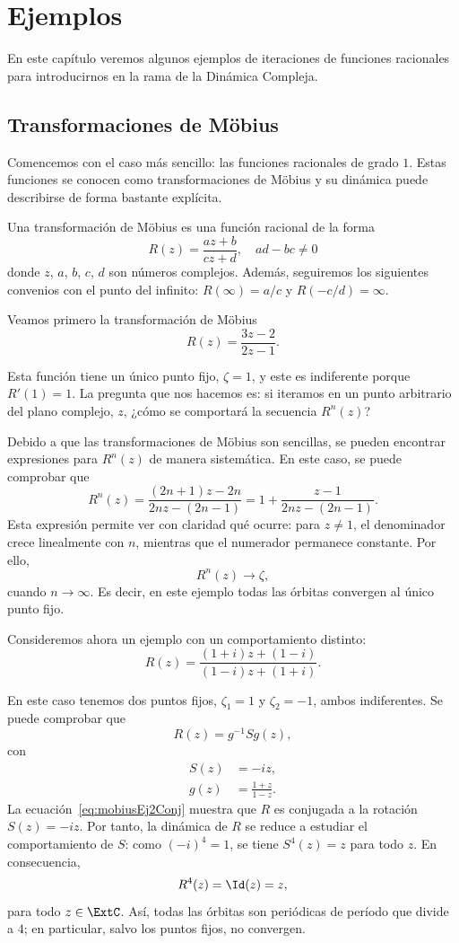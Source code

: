 \chapter{Ejemplos}
En este capítulo veremos algunos ejemplos de iteraciones de funciones racionales
para introducirnos en la rama de la Dinámica Compleja.

\section{Transformaciones de Möbius}
Comencemos con el caso más sencillo: las funciones racionales de grado $1$.
Estas funciones se conocen como transformaciones de Möbius y su dinámica puede
describirse de forma bastante explícita.

\begin{definicion}
    Una transformación de Möbius es una función racional de la forma
    \[
        R(z) = \frac{az+b}{cz+d}, \quad ad-bc \ne 0
    \] 
    donde $z$, $a$, $b$, $c$, $d$ son números complejos. Además, seguiremos los
    siguientes convenios con el punto del infinito: $R(\infty)=a/c$ y
    $R(-c/d)= \infty$.
\end{definicion}

Veamos primero la transformación de Möbius
\[
    R(z) = \frac{3z-2}{2z-1}.
\]

Esta función tiene un único punto fijo, $\zeta = 1$, y este es indiferente
porque $R'(1) = 1$. La pregunta que nos hacemos es: si iteramos en un punto
arbitrario del plano complejo, $z$, ¿cómo se comportará la secuencia $R^n(z)$?

Debido a que las transformaciones de Möbius son sencillas, se pueden encontrar
expresiones para $R^n(z)$ de manera sistemática. En este caso, se puede
comprobar que
\[
    R^n(z) = \frac{(2n+1)z-2n}{2nz-(2n-1)} =  1 + \frac{z-1}{2nz-(2n-1)}.
\]
Esta expresión permite ver con claridad qué ocurre: para $z \neq 1$, el
denominador crece linealmente con $n$, mientras que el numerador permanece
constante. Por ello,
\[
    R^n(z) \to \zeta,
\]
cuando $n \to \infty$. Es decir, en este ejemplo todas las órbitas convergen al
único punto fijo.

Consideremos ahora un ejemplo con un comportamiento distinto:
\[
    R(z) = \frac{(1+i)z + (1-i)}{(1-i)z + (1+i)}.
\]

En este caso tenemos dos puntos fijos, $\zeta_1 = 1$ y $\zeta_2 = -1$, ambos
indiferentes. Se puede comprobar que
\begin{equation}\label{eq:mobiusEj2Conj}
    R(z) = g^{-1}Sg(z),
\end{equation}
con
\begin{align*}
    S(z) &= -iz, \\
    g(z) &= \frac{1+z}{1-z}.
\end{align*}
La ecuación~\ref{eq:mobiusEj2Conj} muestra que $R$ es conjugada a la rotación
$S(z)=-iz$. Por tanto, la dinámica de $R$ se reduce a estudiar el comportamiento
de $S$: como $(-i)^4=1$, se tiene $S^4(z)=z$ para todo $z$. En consecuencia,
\[
    R^4(z)=\Id(z)=z,
\]
para todo $z \in \ExtC$. Así, todas las órbitas son periódicas de período que
divide a $4$; en particular, salvo los puntos fijos, no convergen.

